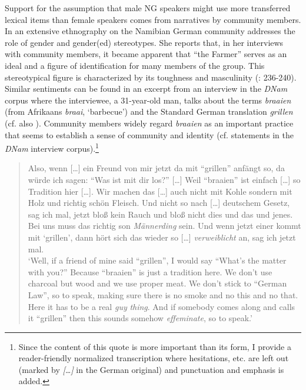 \documentclass[output=paper]{langsci/langscibook}
\begin{document}
Support for the assumption that male NG speakers might use more transferred lexical items than female speakers comes from narratives by community members. In an extensive ethnography on the Namibian German community \citet{schmidt-lauber_verkehrte_1998} addresses the role of gender and gender(ed) stereotypes. She reports that, in her interviews with community members, it became apparent that “the Farmer” serves as an ideal and a figure of identification for many members of the group. This stereotypical figure is characterized by its toughness and masculinity (\citealt{schmidt-lauber_verkehrte_1998}: 236-240). Similar sentiments can be found in an excerpt from an interview in the \textit{DNam} corpus where the interviewee, a 31-year-old man, talks about the terms \textit{braaien} (from Afrikaans \textit{braai}, ‘barbecue’) and the Standard German translation \textit{grillen} (cf. also \citealt{zimmer_linguisticvar_toappear}). Community members widely regard \textit{braaien} as an important practice that seems to establish a sense of community and identity (cf. statements in the \textit{DNam} interview corpus).\footnote{Since the content of this quote is more important than its form, I provide a reader-friendly normalized transcription where hesitations, etc. are left out (marked by \textit{[…]} in the German original) and punctuation and emphasis is added.}

\begin{quotation}
Also, wenn […] ein Freund von mir jetzt da mit “grillen” anfängt so, da würde ich sagen: “Was ist mit dir los?” […] Weil “braaien” ist einfach […] so Tradition hier […]. Wir machen das […] auch nicht mit Kohle sondern mit Holz und richtig schön Fleisch. Und nicht so nach […] deutschem Gesetz, sag ich mal, jetzt bloß kein Rauch und bloß nicht dies und das und jenes. Bei uns muss das richtig son \textit{Männerding} sein. Und wenn jetzt einer kommt mit ‘grillen’, dann hört sich das wieder so […] \textit{verweiblicht} an, sag ich jetzt mal.\medskip\\
‘Well, if a friend of mine said “grillen”, I would say “What’s the matter with you?” Because “braaien” is just a tradition here. We don’t use charcoal but wood and we use proper meat. We don’t stick to “German Law”, so to speak, making sure there is no smoke and no this and no that. Here it has to be a real \textit{guy} \textit{thing}. And if somebody comes along and calls it “grillen” then this sounds somehow \textit{effeminate}, so to speak.’\end{quotation}
\end{document}
